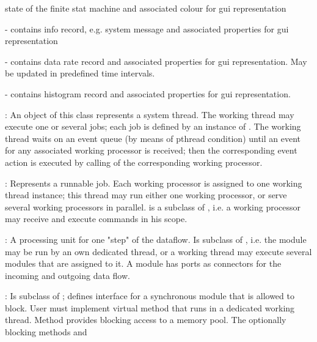 \begin{description}
\begin{compactitem}[$\bullet$]
      state of the finite stat machine and associated colour for gui representation
\item {} - contains info record, e.g. system message 
      and associated properties for gui representation
\item {} - contains data rate record and associated 
      properties for gui representation. May be updated in predefined time intervals.
\item {} - contains histogram record and 
      associated properties for gui representation.
\end{compactitem}
\item[\class{dabc::WorkingThread}] :  
An object of this class represents a system thread. 
   The working thread may execute one or several jobs; each job is defined 
   by an instance of . The working thread waits on an 
   event queue (by means of pthread condition) until an event for any 
   associated working processor is received; then the corresponding event action is 
   executed by calling  of the corresponding working processor.
\item[\class{dabc::WorkingProcessor}] :   
Represents a runnable job. Each 
   working processor is assigned to one working thread instance; 
   this thread may run either one working processor, or serve several
    working processors in parallel. 
     is a subclass of , 
   i.e. a working processor may receive and execute commands in 
   his scope. 
\item[\class{dabc::Module}] :  
A processing unit for one "step" of the dataflow. 
   Is subclass of , i.e. the module may be run by an own 
   dedicated thread, or a working thread may execute several modules that 
   are assigned to it. A module has ports as connectors for the 
   incoming and outgoing data flow.   
\item[\class{dabc::ModuleSync}] : 
Is subclass of ; defines interface for a 
   synchronous module that is allowed to block. User must implement virtual 
   method  that runs in a dedicated working thread. 
   Method  provides blocking access to a memory pool. 
   The optionally blocking methods  and

\end{description}
